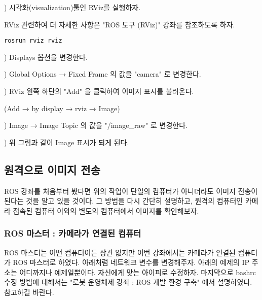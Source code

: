 \setcounter{num}{0}

\noindent
{}\thenum) 시각화(visualization)툴인 RViz를 실행하자.

RViz 관련하여 더 자세한 사항은 "ROS 도구 (RViz)" 강좌를 참조하도록 하자.

\begin{lstlisting}[language=ROS]
rosrun rviz rviz
\end{lstlisting}

\noindent
{}\thenum) Displays 옵션을 변경한다.

\vspace{\baselineskip}
\noindent
{}) Global Options → Fixed Frame 의 값을 "camera" 로 변경한다.

\vspace{\baselineskip}
\noindent
{}) RViz 왼쪽 하단의 "Add" 을 클릭하여 이미지 표시를 불러온다.

\noindent
(Add → by display → rviz → Image)

\vspace{\baselineskip}
\noindent
{}) Image → Image Topic 의 값을 "/image\_raw" 로 변경한다.

\vspace{\baselineskip}
\noindent
{}) 위 그림과 같이 Image 표시가 되게 된다.

\subsection{원격으로 이미지 전송}

ROS 강좌를 처음부터 봤다면 위의 작업이 단일의 컴퓨터가 아니더라도 이미지 전송이 된다는 것을 알고 있을 것이다. 그 방법을 다시 간단히 설명하고, 원격의 컴퓨터인 카메라 접속된 컴퓨터 이외의 별도의 컴퓨터에서 이미지를 확인해보자.

\subsubsection{ROS 마스터 : 카메라가 연결된 컴퓨터}

ROS 마스터는 어떤 컴퓨터이든 상관 없지만 이번 강좌에서는 카메라가 연결된 컴퓨터가 ROS 마스터로 하였다. 아래처럼 네트워크 변수를 변경해주자. 아래의 예제의 IP 주소는 어디까지나 예제일뿐이다. 자신에게 맞는 아이피로 수정하자. 마지막으로 bashrc 수정 방법에 대해서는 "로봇 운영체제 강좌 : ROS 개발 환경 구축" 에서 설명하였다. 참고하길 바란다.

